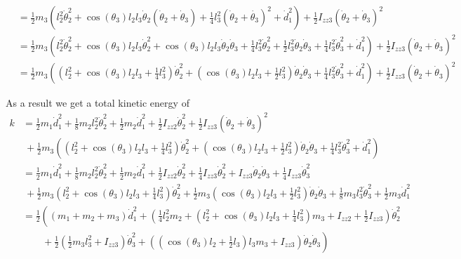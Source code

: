 \documentclass[10pt,a4paper]{article}
\begin{document}
\begin{align*}
        & = \frac{1}{2}m_{3} \left( l_{2}^{2}\dot{\theta}_{2}^{2} + \cos(\theta_{3})l_{2}l_{3}\dot{\theta}_{2}(\dot{\theta}_{2} + \dot{\theta}_{3}) + \frac{1}{4}l_{3}^{2}(\dot{\theta}_{2} + \dot{\theta_{3}})^{2} + \dot{d}_{1}^{2} \right) + \frac{1}{2} I_{zz3}(\dot{\theta}_{2} + \dot{\theta}_{3})^{2}\\
        & = \frac{1}{2}m_{3} \left( l_{2}^{2}\dot{\theta}_{2}^{2} + \cos(\theta_{3})l_{2}l_{3}\dot{\theta}_{2}^{2} + \cos(\theta_{3})l_{2}l_{3}\dot{\theta}_{2}\dot{\theta}_{3} + \frac{1}{4}l_{3}^{2}\dot{\theta}_{2}^{2} + \frac{1}{2}l_{3}^{2}\dot{\theta}_{2}\dot{\theta}_{3} + \frac{1}{4}l_{3}^{2}\dot{\theta}_{3}^{2} + \dot{d}_{1}^{2} \right) + \frac{1}{2} I_{zz3}(\dot{\theta}_{2} + \dot{\theta}_{3})^{2}\\
        & = \frac{1}{2}m_{3} \left( \left( l_{2}^{2} + \cos(\theta_{3})l_{2}l_{3} + \frac{1}{4}l_{3}^{2} \right)\dot{\theta}_{2}^{2} + \left( \cos(\theta_{3})l_{2}l_{3} + \frac{1}{2}l_{3}^{2} \right)\dot{\theta}_{2}\dot{\theta}_{3} + \frac{1}{4}l_{3}^{2}\dot{\theta}_{3}^{2} + \dot{d}_{1}^{2} \right) + \frac{1}{2} I_{zz3}(\dot{\theta}_{2} + \dot{\theta}_{3})^{2}
\end{align*}

As a result we get a total kinetic energy of
\begin{align*}
  k & = \frac{1}{2} m_{1} \dot{d}_{1}^{2} + \frac{1}{8} m_{2}l_{2}^{2}\dot{\theta}_{2}^{2} + \frac{1}{2} m_{2}\dot{d}_{1}^{2} + \frac{1}{2} I_{zz2} \dot{\theta}_{2}^{2} + \frac{1}{2} I_{zz3}(\dot{\theta}_{2} + \dot{\theta}_{3})^{2}\\
    &\ + \frac{1}{2}m_{3} \left( \left( l_{2}^{2} + \cos(\theta_{3})l_{2}l_{3} + \frac{1}{4}l_{3}^{2} \right)\dot{\theta}_{2}^{2} + \left( \cos(\theta_{3})l_{2}l_{3} + \frac{1}{2}l_{3}^{2} \right)\dot{\theta}_{2}\dot{\theta}_{3} + \frac{1}{4}l_{3}^{2}\dot{\theta}_{3}^{2} + \dot{d}_{1}^{2} \right)\\
    & = \frac{1}{2} m_{1} \dot{d}_{1}^{2} + \frac{1}{8} m_{2}l_{2}^{2}\dot{\theta}_{2}^{2} + \frac{1}{2} m_{2}\dot{d}_{1}^{2} + \frac{1}{2} I_{zz2} \dot{\theta}_{2}^{2} + \frac{1}{4}I_{zz3}\dot{\theta}_{2}^{2} + I_{zz3}\dot{\theta}_{2}\dot{\theta}_{3} + \frac{1}{4}I_{zz3}\dot{\theta}_{3}^{2}\\
    &\ + \frac{1}{2}m_{3}\left( l_{2}^{2} + \cos(\theta_{3})l_{2}l_{3} + \frac{1}{4}l_{3}^{2} \right)\dot{\theta}_{2}^{2} + \frac{1}{2}m_{3}\left( \cos(\theta_{3})l_{2}l_{3} + \frac{1}{2}l_{3}^{2} \right)\dot{\theta}_{2}\dot{\theta}_{3} + \frac{1}{8}m_{3}l_{3}^{2}\dot{\theta}_{3}^{2} + \frac{1}{2}m_{3}\dot{d}_{1}^{2}\\
    & = \frac{1}{2} \left( (m_{1} + m_{2} + m_{3}) \dot{d}_{1}^{2} + \left( \frac{1}{4}l_{2}^{2}m_{2} + \left( l_{2}^{2} + \cos(\theta_{3})l_{2}l_{3} + \frac{1}{4}l_{3}^{2} \right)m_{3} + I_{zz2} + \frac{1}{2}I_{zz3} \right)\dot{\theta}_{2}^{2}\right.\\
    &\left. \qquad + \frac{1}{2}\left( \frac{1}{2}m_{3}l_{3}^{2} + I_{zz3} \right)\dot{\theta}_{3}^{2} + \left( \left( \cos(\theta_{3})l_{2} + \frac{1}{2}l_{3} \right)l_{3}m_{3} + I_{zz3} \right)\dot{\theta}_{2}\dot{\theta}_{3} \right)\\
\end{align*}
\end{document}
